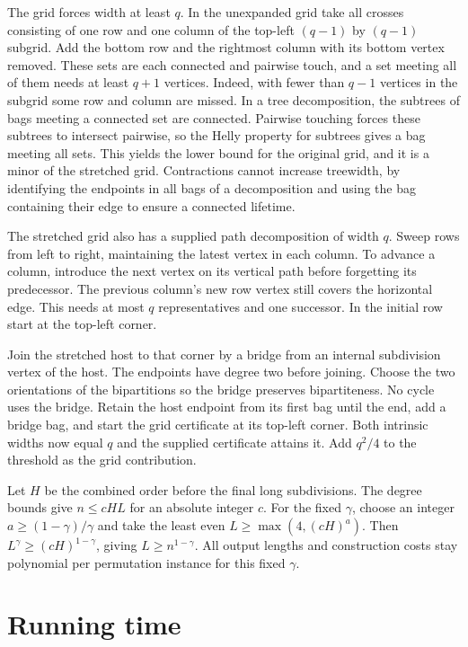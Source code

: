 \documentclass[11pt]{article}
\begin{document}
The grid forces width at least \(q\). In the unexpanded grid
take all crosses consisting of one row and one column of the
top-left \((q-1)\) by \((q-1)\) subgrid. Add the bottom row and
the rightmost column with its bottom vertex removed. These
sets are each connected and pairwise touch, and a set meeting
all of them needs at least \(q+1\) vertices. Indeed, with fewer
than \(q-1\) vertices in the subgrid some row and column are
missed. In a tree decomposition, the subtrees of bags meeting
a connected set are connected. Pairwise touching forces these
subtrees to intersect pairwise, so the Helly property for
subtrees gives a bag meeting all sets. This yields the lower
bound for the original grid, and it is a minor of the stretched
grid. Contractions cannot increase treewidth, by identifying
the endpoints in all bags of a decomposition and using the
bag containing their edge to ensure a connected lifetime.

The stretched grid also has a supplied path decomposition of
width \(q\). Sweep rows from left to right, maintaining the
latest vertex in each column. To advance a column, introduce
the next vertex on its vertical path before forgetting its
predecessor. The previous column's new row vertex still covers
the horizontal edge. This needs at most \(q\) representatives
and one successor. In the initial row start at the top-left corner.

Join the stretched host to that corner by a bridge from an
internal subdivision vertex of the host. The endpoints have
degree two before joining. Choose the two orientations of the
bipartitions so the bridge preserves bipartiteness. No cycle
uses the bridge. Retain the host endpoint from its first bag
until the end, add a bridge bag, and start the grid certificate
at its top-left corner. Both intrinsic widths now equal \(q\)
and the supplied certificate attains it. Add \(q^2/4\) to the
threshold as the grid contribution.

Let \(H\) be the combined order before the final long subdivisions.
The degree bounds give \(n\le cHL\) for an absolute integer \(c\).
For the fixed \(\gamma\), choose an integer \(a\ge(1-\gamma)/\gamma\)
and take the least even \(L\ge\max(4,(cH)^a)\).
Then \(L^\gamma\ge(cH)^{1-\gamma}\), giving \(L\ge n^{1-\gamma}\).
All output lengths and construction costs stay polynomial per
permutation instance for this fixed \(\gamma\).

\section{Running time}
\end{document}
